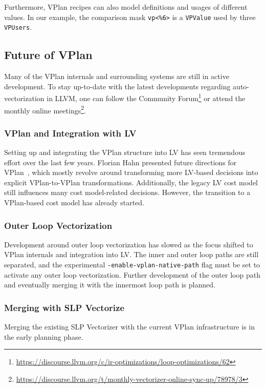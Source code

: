 \documentclass[sigplan,11pt,nonacm]{acmart}
\begin{document}
Furthermore, VPlan recipes can also model definitions and usages of different values. In our example,
the comparison mask \texttt{vp<\%6>} is a \texttt{VPValue} used by three \texttt{VPUsers}.

\subsection{Future of VPlan}
Many of the VPlan internals and surrounding systems are still in active development. To stay up-to-date 
with the latest developments regarding auto-vectorization in LLVM, one can follow the 
Community Forum\footnote{\url{https://discourse.llvm.org/c/ir-optimizations/loop-optimizations/62}} or
attend the monthly online 
meetings\footnote{\url{https://discourse.llvm.org/t/monthly-vectorizer-online-sync-up/78978/3}}.

\subsubsection{VPlan and Integration with LV}
Setting up and integrating the VPlan structure into LV has seen tremendous effort over the last 
few years. Florian Hahn presented future directions for 
VPlan~\cite{llvmvplanupdate}, which mostly revolve around transforming more LV-based decisions into
explicit VPlan-to-VPlan transformations. Additionally, the legacy LV cost model still influences 
many cost model-related decisions. However, the transition to a VPlan-based cost model has already 
started.

\subsubsection{Outer Loop Vectorization}
Development around outer loop vectorization has slowed as the focus shifted to VPlan internals 
and integration into LV. The inner and outer loop paths are still separated, and the 
experimental \texttt{-enable-\allowbreak vplan-\allowbreak native-\allowbreak path} flag must be 
set to activate any outer 
loop vectorization. Further development of the outer loop path and eventually merging it 
with the innermost loop path is planned.

\subsubsection{Merging with SLP Vectorize}
Merging the existing SLP Vectorizer with the current VPlan infrastructure is in the early planning phase.
\end{document}
